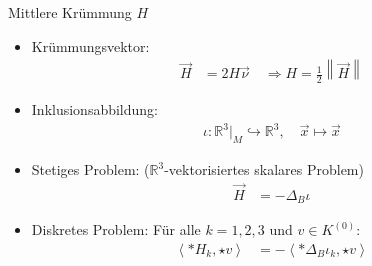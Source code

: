 \documentclass[handout]{beamer}
\newcommand{\R}{\mathds{R}}
\begin{document}
  \begin{frame}
    \begin{block}{Mittlere Krümmung \( H \)}
      \begin{itemize}
        \item<1-> Krümmungsvektor: 
          \begin{align*}
            \vec{H} &=2 H \vec{\nu}\quad  \Longrightarrow  H = \frac{1}{2}\left\| \vec{H} \right\|
          \end{align*}
        \item<2-> Inklusionsabbildung: 
            \begin{align*}
                \iota: \R^{3}|_{M} \hookrightarrow \R^{3},\quad \vec{x} \mapsto \vec{x}
            \end{align*}
        \item<3-> Stetiges Problem:  \quad\quad (\( \R^{3} \)-vektorisiertes skalares Problem)
          \begin{align*}
            \vec{H} &= -\Delta_{B}\iota 
          \end{align*}
        \item<4-> Diskretes Problem: Für alle \( k=1,2,3 \) und \( v\in K^{(0)} \):
          \begin{align*}
            \left\langle *H_{k}, \star v \right\rangle &= - \left\langle *\Delta_{B}\iota_{k}, \star v \right\rangle
          \end{align*}
      \end{itemize}
    \end{block}
  \end{frame}
\end{document}
